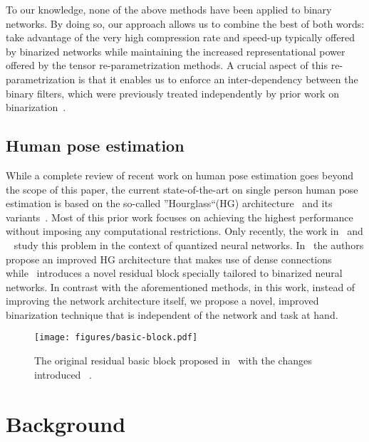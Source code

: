 \documentclass[10pt,twocolumn,letterpaper]{article}
\begin{document}
To our knowledge, none of the above methods have been applied to binary networks. By doing so, our approach allows us to combine the best of both words: take advantage of the very high compression rate and speed-up typically offered by binarized networks while maintaining the increased representational power offered by the tensor re-parametrization methods. A crucial aspect of this re-parametrization is that it enables us to enforce an inter-dependency between the binary filters, which were previously treated independently by prior work on binarization~\cite{rastegari2016xnor,courbariaux2016binarized}.





\subsection{Human pose estimation}\label{ssec:human-pose-estimation}
While a complete review of recent work on human pose estimation goes beyond the scope of this paper, the current state-of-the-art on single person human pose estimation is based on the so-called ''Hourglass``(HG) architecture~\cite{newell2016stacked} and its variants~\cite{bulat2016human,tang2018deeply,ke2018multi,yang2017learning}. Most of this prior work focuses on achieving the highest performance without imposing any computational restrictions. Only recently, the work in~\cite{tang2018quantized} and ~\cite{bulat2017binarized} study this problem in the context of quantized neural networks. In~\cite{tang2018quantized} the authors propose an improved HG architecture that makes use of dense connections~\cite{huang2016densely} while~\cite{bulat2017binarized} introduces a novel residual block specially tailored to binarized neural networks. In contrast with the aforementioned methods, in this work, instead of improving the network architecture itself, we propose a novel, improved binarization technique that is independent of the network and task at hand.

\begin{figure}
    \centering
    \texttt{[image: figures/basic-block.pdf]}
    \caption{The original residual basic block proposed in~\cite{he2016deep} with the changes introduced ~\cite{rastegari2016xnor}.}
    \label{fig:basic-block}
\end{figure}
 \section{Background}\label{ssec:background}
\end{document}
